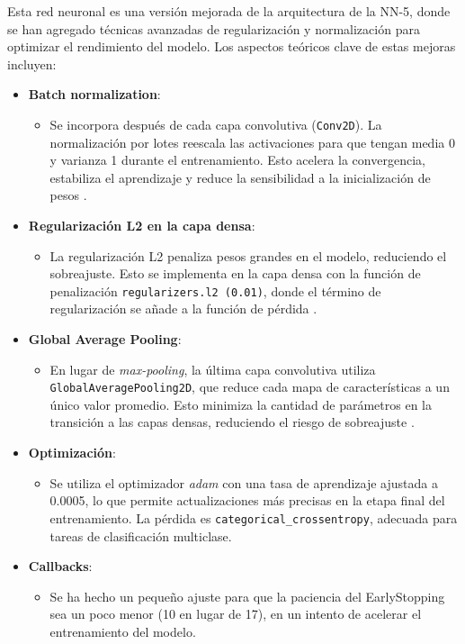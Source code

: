 Esta red neuronal es una versión mejorada de la arquitectura de la NN-5, donde se han agregado técnicas avanzadas de regularización y normalización para optimizar el rendimiento del modelo. Los aspectos teóricos clave de estas mejoras incluyen:

\begin{itemize}
	\item \textbf{Batch normalization}:
	\begin{itemize}
		\item Se incorpora después de cada capa convolutiva (\texttt{Conv2D}). La normalización por lotes reescala las activaciones para que tengan media 0 y varianza 1 durante el entrenamiento. Esto acelera la convergencia, estabiliza el aprendizaje y reduce la sensibilidad a la inicialización de pesos \parencite{ioffe2015batchnorm}.
	\end{itemize}
	
	\item \textbf{Regularización L2 en la capa densa}:
	\begin{itemize}
		\item La regularización L2 penaliza pesos grandes en el modelo, reduciendo el sobreajuste. Esto se implementa en la capa densa con la función de penalización \texttt{regularizers.l2
		(0.01)}, donde el término de regularización se añade a la función de pérdida \parencite{goodfellow2016deep}.
	\end{itemize}
	
	\item \textbf{Global Average Pooling}:
	\begin{itemize}
		\item En lugar de \textit{max-pooling}, la última capa convolutiva utiliza \texttt{GlobalAveragePooling2D}, que reduce cada mapa de características a un único valor promedio. Esto minimiza la cantidad de parámetros en la transición a las capas densas, reduciendo el riesgo de sobreajuste \parencite{lin2013network}.
	\end{itemize}
	
	\item \textbf{Optimización}:
	\begin{itemize}
		\item Se utiliza el optimizador \textit{adam} con una tasa de aprendizaje ajustada a 0.0005, lo que permite actualizaciones más precisas en la etapa final del entrenamiento. La pérdida es \texttt{categorical\_crossentropy}, adecuada para tareas de clasificación multiclase.
	\end{itemize}
	
	\item \textbf{Callbacks}:
	\begin{itemize}
		\item Se ha hecho un pequeño ajuste para que la paciencia del EarlyStopping sea un poco menor (10 en lugar de 17), en un intento de acelerar el entrenamiento del modelo. 
	\end{itemize}
\end{itemize}

